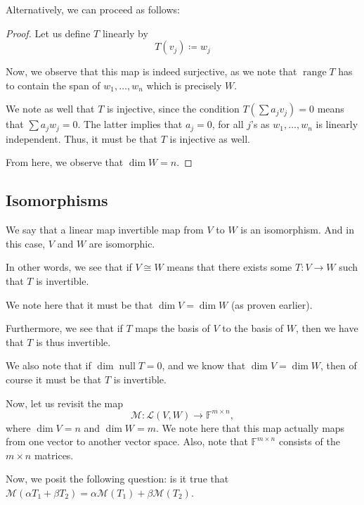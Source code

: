 \documentclass[openany]{book}
\DeclareMathOperator*{\vnull}{null}
\DeclareMathOperator*{\vrange}{range}
\begin{document}
Alternatively, we can proceed as follows:
\begin{proof}
	Let us define $T$ linearly by
	\begin{equation*}
		T(v_{j}) \coloneq w_{j} \tag*{for j = 1, \ldots, n.}
	\end{equation*}

	Now, we observe that this map is indeed surjective, as we note that $\vrange T$ has to contain the span of $w_{1}, \ldots, w_{n}$ which is precisely $W$.
	
	We note as well that $T$ is injective, since the condition $T(\sum a_{j}v_{j}) = 0$ means that $\sum a_{j}w_{j} = 0$. The latter implies that $a_{j} = 0$, for all $j$'s as $w_{1}, \ldots, w_{n}$ is linearly independent. Thus, it must be that $T$ is injective as well.
	
	From here, we observe that $\dim W = n$.
\end{proof}

\subsection{Isomorphisms}
\begin{thm}
	We say that a linear map invertible map from $V$ to $W$ is an isomorphism. And in this case, $V$ and $W$ are isomorphic.
	
	In other words, we see that if $V \cong W$ means that there exists some $T : V \rightarrow W$ such that $T$ is invertible.
\end{thm}

We note here that it must be that $\dim V = \dim W$ (as proven earlier).

Furthermore, we see that if $T$ maps the basis of $V$ to the basis of $W$, then we have that $T$ is thus invertible.

We also note that if $\dim \vnull T = 0$, and we know that $\dim V = \dim W$, then of course it must be that $T$ is invertible.


Now, let us revisit the map
\begin{equation*}
	\mathcal M : \mathcal L(V,W) \rightarrow \mathbb{F}^{m \times n},
\end{equation*}
where $\dim V = n$ and $\dim W = m$. We note here that this map actually maps from one vector to another vector space. Also, note that $\mathbb{F}^{m \times n}$ consists of the $m \times n$ matrices.

Now, we posit the following question: is it true that $\mathcal M(\alpha T_{1} + \beta T_{2}) = \alpha \mathcal M (T_{1}) + \beta \mathcal M(T_{2})$.
\end{document}
